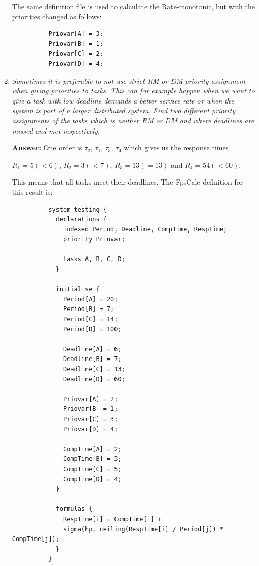 \documentclass[a4paper,10pt]{article}
\newcommand{\answer}{\textbf{Answer: }}
\begin{document}
\begin{enumerate}
        The same definition file is used to calculate the Rate-monotonic, but with the priorities changed as follows:
        
        \begin{lstlisting}
          Priovar[A] = 3;
		  Priovar[B] = 1;
		  Priovar[C] = 2;
		  Priovar[D] = 4;
        \end{lstlisting}

	\item \emph{Sometimes it is preferable to not use strict RM or DM priority assignment when giving priorities to tasks. This can for example happen when we want to give a task with low deadline demands a better service rate or when the system is part of a larger distributed system. Find two different priority assignments of the tasks which is neither RM or DM and where deadlines are missed and met respectively.}
	
	\answer One order is $\tau_2$, $\tau_1$, $\tau_3$, $\tau_4$ which gives us the response times 
	
	$R_1 = 5 (< 6)$, $R_2 = 3 (< 7)$, $R_3 = 13 (= 13)$ and $R_4 = 54 (< 60)$. 
	
	This means that all tasks meet their deadlines. The FpsCalc definition for this result is:

        \begin{lstlisting}
          system testing {
            declarations {		
              indexed Period, Deadline, CompTime, RespTime;
              priority Priovar;	
              
              tasks A, B, C, D;
            }
            
            initialise {
              Period[A] = 20;
              Period[B] = 7;
              Period[C] = 14;
              Period[D] = 100;
              
              Deadline[A] = 6;
              Deadline[B] = 7;
              Deadline[C] = 13;
              Deadline[D] = 60;
              
              Priovar[A] = 2;
              Priovar[B] = 1;
              Priovar[C] = 3;
              Priovar[D] = 4;
              
              CompTime[A] = 2;
              CompTime[B] = 3;
              CompTime[C] = 5;
              CompTime[D] = 4;
            }
            
            formulas {
              RespTime[i] = CompTime[i] +
              sigma(hp, ceiling(RespTime[i] / Period[j]) * CompTime[j]);
            }
          }
        \end{lstlisting}


\end{enumerate}
\end{document}
